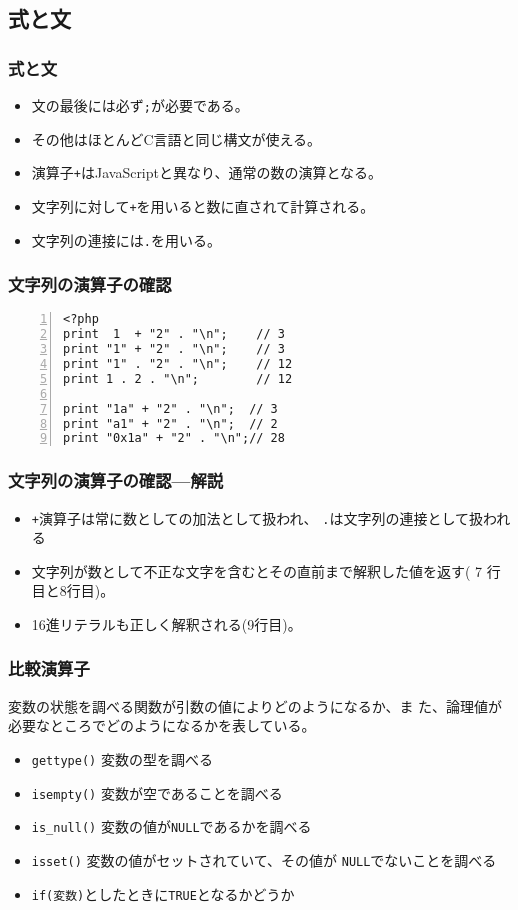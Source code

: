\subsection{式と文}
\begin{frame}[containsverbatim]
\frametitle{式と文}
\begin{itemize}
 \item 文の最後には必ず\texttt{;}が必要である。
 \item その他はほとんどC言語と同じ構文が使える。
 \item 演算子\texttt{+}はJavaScriptと異なり、通常の数の演算となる。
 \item 文字列に対して\texttt{+}を用いると数に直されて計算される。
 \item 文字列の連接には\texttt{.}を用いる。
\end{itemize}
\end{frame}
\begin{frame}[containsverbatim]
\frametitle{文字列の演算子の確認}
\begin{Verbatim}[numbers=left]
<?php
print  1  + "2" . "\n";    // 3
print "1" + "2" . "\n";    // 3
print "1" . "2" . "\n";    // 12
print 1 . 2 . "\n";        // 12

print "1a" + "2" . "\n";  // 3
print "a1" + "2" . "\n";  // 2
print "0x1a" + "2" . "\n";// 28
\end{Verbatim}
\end{frame}
\begin{frame}[containsverbatim]
\frametitle{文字列の演算子の確認---解説}
\begin{itemize}
 \item \texttt{+}演算子は常に数としての加法として扱われ、
 \texttt{.}は文字列の連接として扱われる
 \item 文字列が数として不正な文字を含むとその直前まで解釈した値を返す(
       7 行目と8行目)。
 \item 16進リテラルも正しく解釈される(9行目)。
\end{itemize}
\end{frame}
\begin{frame}[containsverbatim]
\frametitle{比較演算子}
変数の状態を調べる関数が引数の値によりどのようになるか、ま
た、論理値が必要なところでどのようになるかを表している。
\begin{itemize}
 \item \texttt{gettype()} 変数の型を調べる
 \item \texttt{isempty()} 変数が空であることを調べる
 \item \texttt{is\_null()} 変数の値が\texttt{NULL}であるかを調べる
 \item \texttt{isset()} 変数の値がセットされていて、その値が
       \texttt{NULL}でないことを調べる
 \item \texttt{if(変数)}としたときに\texttt{TRUE}となるかどうか
\end{itemize}
\end{frame}
